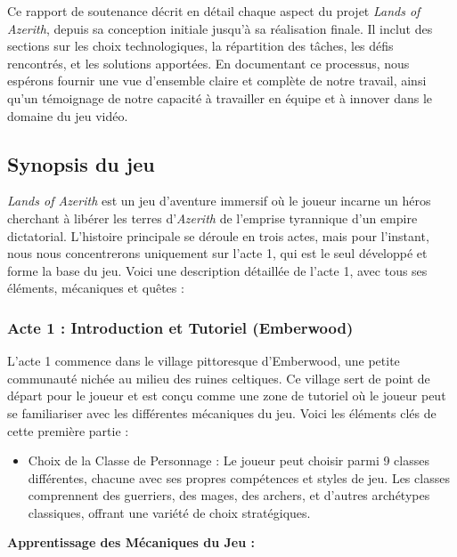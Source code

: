 Ce rapport de soutenance décrit en détail chaque aspect du projet
\textit{Lands of Azerith}, depuis sa conception initiale jusqu'à sa réalisation finale.
Il inclut des sections sur les choix technologiques, la répartition des tâches, les défis rencontrés, et les solutions apportées. En documentant ce processus,
nous espérons fournir une vue d'ensemble claire et complète de notre travail, ainsi qu'un témoignage de notre capacité à travailler en équipe et à innover dans le domaine du
jeu vidéo.






\subsection{Synopsis du jeu}

\textit{Lands of Azerith} est un jeu d'aventure immersif où le joueur incarne un héros cherchant à libérer les terres d'\textit{Azerith} de l'emprise tyrannique d'un empire dictatorial.
L'histoire principale se déroule en trois actes, mais pour l'instant, nous nous concentrerons uniquement sur l'acte 1, qui est le seul développé et forme la base du jeu.
Voici une description détaillée de l'acte 1, avec tous ses éléments, mécaniques et quêtes :

\subsubsection*{Acte 1 : Introduction et Tutoriel (Emberwood)}

L'acte 1 commence dans le village pittoresque d'Emberwood, une petite communauté nichée au milieu des ruines celtiques.
Ce village sert de point de départ pour le joueur et est conçu comme une zone de tutoriel où le joueur peut se familiariser avec les différentes mécaniques du jeu.
Voici les éléments clés de cette première partie :
\\

\begin{itemize}
    \item Choix de la Classe de Personnage : Le joueur peut choisir parmi 9 classes différentes, chacune avec ses propres compétences et styles de jeu. Les classes comprennent des guerriers, des mages, des archers, et d'autres archétypes classiques, offrant une variété de choix stratégiques.
          \\
\end{itemize}

\textbf{Apprentissage des Mécaniques du Jeu :}
\\

